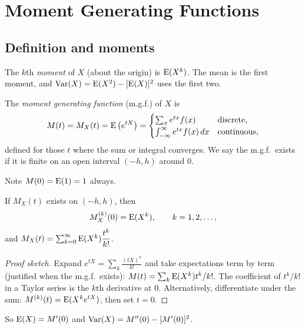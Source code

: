 \chapter{Moment Generating Functions}

\section{Definition and moments}

\begin{definition}[Moments]
The $k$th \emph{moment} of $X$ (about the origin) is $\operatorname{E}(X^k)$. The mean is the first
moment, and $\operatorname{Var}(X) = \operatorname{E}(X^2) - [\operatorname{E}(X)]^2$ uses the first two.
\end{definition}

\begin{definition}
The \emph{moment generating function} (m.g.f.) of $X$ is
\[
  M(t) = M_X(t) = \operatorname{E}\left(e^{tX}\right) = \begin{cases} \sum_x e^{tx}f(x) & \text{discrete},\\
  \int_{-\infty}^{\infty}e^{tx}f(x)\,dx & \text{continuous},\end{cases}
\]
defined for those $t$ where the sum or integral converges. We say the m.g.f.\ exists if it
is finite on an open interval $(-h, h)$ around $0$.
\end{definition}

Note $M(0) = \operatorname{E}(1) = 1$ always.

\begin{theorem}
If $M_X(t)$ exists on $(-h,h)$, then
\[
  M_X^{(k)}(0) = \operatorname{E}(X^k), \qquad k = 1,2,\dots,
\]
and $M_X(t) = \sum_{k=0}^\infty \operatorname{E}(X^k)\dfrac{t^k}{k!}$.
\end{theorem}

\begin{proof}[Proof sketch]
Expand $e^{tX} = \sum_k \frac{(tX)^k}{k!}$ and take expectations term by term (justified
when the m.g.f.\ exists): $M(t) = \sum_k \operatorname{E}(X^k)t^k/k!$. The coefficient of $t^k/k!$ in a
Taylor series is the $k$th derivative at $0$. Alternatively, differentiate under the sum:
$M^{(k)}(t) = \operatorname{E}(X^ke^{tX})$, then set $t=0$.
\end{proof}

So $\operatorname{E}(X) = M'(0)$ and $\operatorname{Var}(X) = M''(0) - [M'(0)]^2$.

